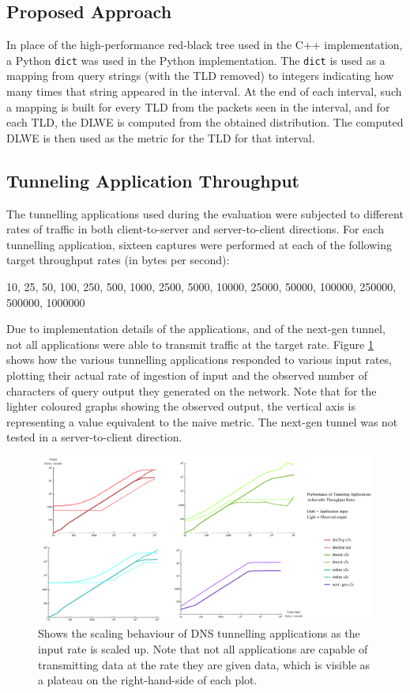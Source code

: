 \documentclass[12pt]{report}
\theoremstyle{remark}
\theoremstyle{definition}
\theoremstyle{definition}
\theoremstyle{definition}
\begin{document}
\subsection{Proposed Approach}
\label{proposed-method-python}
In place of the high-performance red-black tree used in the C++ implementation,
a Python \texttt{dict} was used in the Python implementation. The \texttt{dict}
is used as a mapping from query strings (with the TLD removed) to integers
indicating how many times that string appeared in the interval. At the end of
each interval, such a mapping is built for every TLD from the packets seen in
the interval, and for each TLD, the DLWE is computed from the obtained
distribution. The computed DLWE is then used as the metric for the TLD for that
interval.

\subsection{Tunneling Application Throughput}
\label{tunapptp}
The tunnelling applications used during the evaluation were subjected to
different rates of traffic in both client-to-server and server-to-client
directions. For each tunnelling application, sixteen captures were performed at
each of the following target throughput rates (in bytes per second):

10, 25, 50, 100, 250, 500, 1000, 2500, 5000, 10000, 25000, 50000, 100000,
250000, 500000, 1000000

Due to implementation details of the applications, and of the next-gen tunnel,
not all applications were able to transmit traffic at the target rate. Figure
\ref{tunrates} shows how the various tunnelling applications responded to
various input rates, plotting their actual rate of ingestion of input and the
observed number of characters of query output they generated on the network. Note
that for the lighter coloured graphs showing the observed output, the vertical
axis is representing a value equivalent to the naive metric. The next-gen tunnel
was not tested in a server-to-client direction.

\begin{figure}
\centering
\includegraphics[width=\textwidth]{figures/tunrates.pdf}
\caption[DNS Tunneling Application Throughput Scaling]{Shows the scaling
behaviour of DNS tunnelling applications as the input rate is scaled up. Note
that not all applications are capable of transmitting data at the rate they are
given data, which is visible as a plateau on the right-hand-side of each plot.}
\label{tunrates}
\end{figure}
\end{document}
